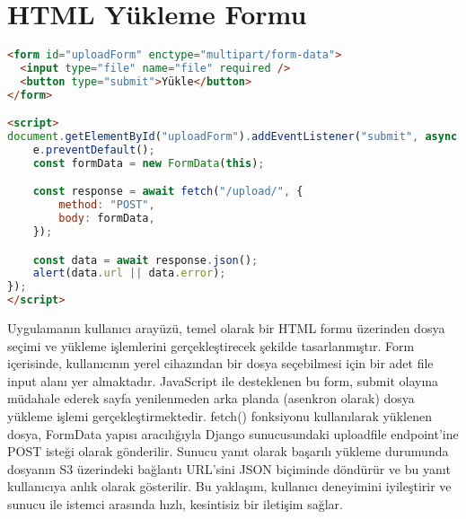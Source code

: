 \section{HTML Yükleme Formu}
\begin{lstlisting}[language=html, caption=upload.html]
<form id="uploadForm" enctype="multipart/form-data">
  <input type="file" name="file" required />
  <button type="submit">Yükle</button>
</form>

<script>
document.getElementById("uploadForm").addEventListener("submit", async function (e) {
    e.preventDefault();
    const formData = new FormData(this);

    const response = await fetch("/upload/", {
        method: "POST",
        body: formData,
    });

    const data = await response.json();
    alert(data.url || data.error);
});
</script>
\end{lstlisting}

Uygulamanın kullanıcı arayüzü, temel olarak bir HTML formu üzerinden dosya seçimi ve yükleme işlemlerini gerçekleştirecek şekilde tasarlanmıştır. Form içerisinde, kullanıcının yerel cihazından bir dosya seçebilmesi için bir adet file input alanı yer almaktadır. JavaScript ile desteklenen bu form, submit olayına müdahale ederek sayfa yenilenmeden arka planda (asenkron olarak) dosya yükleme işlemi gerçekleştirmektedir. fetch() fonksiyonu kullanılarak yüklenen dosya, FormData yapısı aracılığıyla Django sunucusundaki uploadfile endpoint'ine POST isteği olarak gönderilir. Sunucu yanıt olarak başarılı yükleme durumunda dosyanın S3 üzerindeki bağlantı URL’sini JSON biçiminde döndürür ve bu yanıt kullanıcıya anlık olarak gösterilir. Bu yaklaşım, kullanıcı deneyimini iyileştirir ve sunucu ile istemci arasında hızlı, kesintisiz bir iletişim sağlar.
